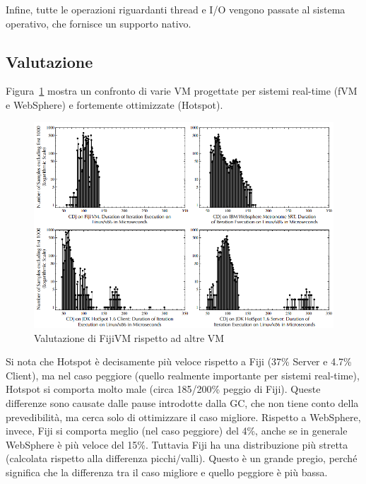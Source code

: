 Infine, tutte le operazioni riguardanti thread e I/O vengono passate al sistema operativo, che fornisce un supporto nativo. 

\subsection{Valutazione}
Figura~\ref{fig:fijicomp} mostra un confronto di varie VM progettate per sistemi real-time (fVM e WebSphere) e fortemente ottimizzate (Hotspot). 
\begin{figure}[h]
	\centering
	\includegraphics[width=0.8\linewidth]{images/fijicomp}
	\caption[Valutazione rispetto ad altre VM]{Valutazione di FijiVM rispetto ad altre VM}
	\label{fig:fijicomp}
\end{figure}

Si nota che Hotspot è decisamente più veloce rispetto a Fiji (37\% Server e 4.7\% Client), ma nel caso peggiore (quello realmente importante per sistemi real-time), Hotspot si comporta molto male (circa 185/200\% peggio di Fiji). Queste differenze sono causate dalle pause introdotte dalla GC, che non tiene conto della prevedibilità, ma cerca solo di ottimizzare il caso migliore. Rispetto a WebSphere, invece, Fiji si comporta meglio (nel caso peggiore) del 4\%, anche se in generale WebSphere è più veloce del 15\%. Tuttavia Fiji ha una distribuzione più stretta (calcolata rispetto alla differenza picchi/valli). Questo è un grande pregio, perché significa che la differenza tra il caso migliore e quello peggiore è più bassa.

